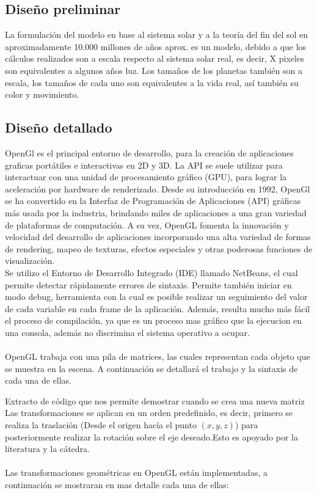 \documentclass[12pt,journal,compsoc]{IEEEtran}
\begin{document}
\subsection{Diseño preliminar}
La formulación del modelo en base al sistema solar y a la teoría del fin del sol en aproximadamente 10.000 millones de años aprox. es un modelo, debido a que los cálculos realizados son a escala respecto al sistema solar real, es decir, X pixeles son equivalentes a algunos años luz. Los tamaños de los planetas también son a escala, los tamaños de cada uno son equivalentes a la vida real, así también su color y movimiento.
\subsection{Diseño detallado}
OpenGl es el principal entorno de desarrollo, para la creación de aplicaciones graficas portátiles e interactivas en  2D y 3D. 
La API se suele utilizar para interactuar con una unidad de procesamiento gráfico (GPU), para lograr la aceleración por hardware de renderizado.
Desde su introducción en 1992, OpenGl se ha convertido en la Interfaz de Programación de Aplicaciones (API) gráficas más usada por la industria, brindando miles de aplicaciones a una gran variedad de plataformas de computación. A su vez, OpenGL fomenta la innovación y velocidad del desarrollo de aplicaciones incorporando una alta variedad de formas de rendering, mapeo de texturas, efectos especiales y otras poderosas funciones de visualización\cite{opengl}.
\\
Se utilizo el Entorno de Desarrollo Integrado (IDE) llamado NetBeans, el cual permite detectar rápidamente errores de sintaxis. Permite también iniciar en modo debug, herramienta con la cual es posible realizar un seguimiento del valor de cada variable en cada frame de la aplicación. Además, resulta mucho más fácil el proceso de compilación, ya que es un proceso mas gráfico que la ejecucion en una consola, además no discrimina el sistema operativo a ocupar.\\
\\
OpenGL trabaja con una pila de matrices, las cuales representan cada objeto que se muestra en la escena. A continuación se detallará el trabajo y la sintaxis de cada una de ellas.
%
 
%
Extracto de código que nos permite demostrar cuando se crea una nueva matriz\\
Las transformaciones se aplican en un orden predefinido, es decir, primero se realiza la traslación (Desde el origen hacía el punto $(x,y,z)$) para posteriormente realizar la rotación sobre el eje deseado.Esto es apoyado por la literatura y la cátedra.\\
\\
Las transformaciones geométricas en OpenGL están implementadas, a continuación se mostraran en mas detalle cada una de ellas:
%
\end{document}
